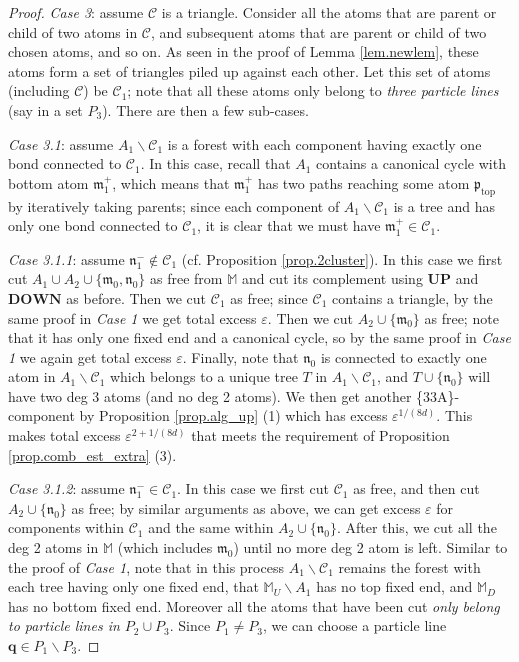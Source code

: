 \documentclass[10pt, reqno]{amsart}
\newcommand{\Mb}{\mathbb M}
\newcommand{\Cc}{\mathcal C}
\newcommand{\mf}{\mathfrak m}
\newcommand{\pf}{\mathfrak p}
\newcommand{\nf}{\mathfrak n}
\theoremstyle{definition}
\theoremstyle{remark}
\numberwithin{equation}{section}
\begin{document}
\begin{proof}
\emph{Case 3}: assume $\Cc$ is a triangle. Consider all the atoms that are parent or child of two atoms in $\Cc$, and subsequent atoms that are parent or child of two chosen atoms, and so on. As seen in the proof of Lemma \ref{lem.newlem}, these atoms form a set of triangles piled up against each other. Let this set of atoms (including $\Cc$) be $\Cc_1$; note that all these atoms only belong to \emph{three particle lines} (say in a set $P_3$). There are then a few sub-cases.

\emph{Case 3.1}: assume $A_1\backslash \Cc_1$ is a forest with each component having exactly one bond connected to $\Cc_1$. In this case, recall that $A_1$ contains a canonical cycle with bottom atom $\mf_1^+$, which means that $\mf_1^+$ has two paths reaching some atom $\pf_{\mathrm{top}}$ by iteratively taking parents; since each component of $A_1\backslash \Cc_1$ is a tree and has only one bond connected to $\Cc_1$, it is clear that we must have $\mf_1^+\in \Cc_1$.

\emph{Case 3.1.1}: assume $\nf_1^-\not\in\Cc_1$ (cf. Proposition \ref{prop.2cluster}). In this case we first cut $A_1\cup A_2\cup\{\mf_0,\nf_0\}$ as free from $\Mb$ and cut its complement using \textbf{UP} and $\textbf{DOWN}$ as before. Then we cut $\Cc_1$ as free; since $\Cc_1$ contains a triangle, by the same proof in \emph{Case 1} we get total excess $\varepsilon$. Then we cut $A_2\cup\{\mf_0\}$ as free; note that it has only one fixed end and a canonical cycle, so by the same proof in \emph{Case 1} we again get total excess $\varepsilon$. Finally, note that $\nf_0$ is connected to exactly one atom in $A_1\backslash \Cc_1$ which belongs to a unique tree $T$ in $A_1\backslash\Cc_1$, and $T\cup\{\nf_0\}$ will have two deg 3 atoms (and no deg 2 atoms). We then get another \{33A\}-component by Proposition \ref{prop.alg_up} (1) which has excess $\varepsilon^{1/(8d)}$. This makes total excess $\varepsilon^{2+1/(8d)}$ that meets the requirement of Proposition \ref{prop.comb_est_extra} (3).

\emph{Case 3.1.2}: assume $\nf_1^-\in\Cc_1$. In this case we first cut $\Cc_1$ as free, and then cut $A_2\cup\{\nf_0\}$ as free; by similar arguments as above, we can get excess $\varepsilon$ for components within $\Cc_1$ and the same within $A_2\cup\{\nf_0\}$. After this, we cut all the deg 2 atoms in $\Mb$ (which includes $\mf_0$) until no more deg 2 atom is left. Similar to the proof of \emph{Case 1}, note that in this process $A_1\backslash\Cc_1$ remains the forest with each tree having only one fixed end, that $\Mb_U\backslash A_1$ has no top fixed end, and $\Mb_D$ has no bottom fixed end. Moreover all the atoms that have been cut \emph{only belong to particle lines in $P_2\cup P_3$}. Since $P_1\neq P_3$, we can choose a particle line $\boldsymbol{q}\in P_1\backslash P_3$. 


\end{proof}
\end{document}
